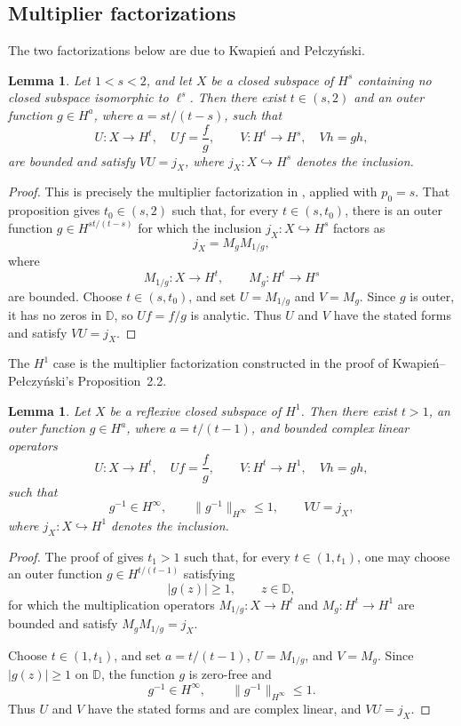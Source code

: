 \documentclass[11pt, reqno]{amsart}
\newtheorem{lemma}[theorem]{Lemma}
\theoremstyle{definition}
\theoremstyle{remark}
\newcommand{\D}{\mathbb{D}}
\begin{document}
\subsection{Multiplier factorizations}

The two factorizations below are due to
Kwapie\'n and Pe{\l}czy\'nski.

\begin{lemma}
\label{lem:kp-below2}
Let \(1<s<2\), and let \(X\) be a closed subspace of \(H^s\)
containing no closed subspace isomorphic to \(\ell^s\). Then there
exist \(t\in(s,2)\) and an outer function \(g\in H^a\), where \(a=st/(t-s)\), such that
\[
        U:X\to H^t,\quad Uf=\frac{f}{g},
        \qquad
        V:H^t\to H^s,\quad Vh=gh,
\]
are bounded and satisfy \(VU=j_X\), where
\(j_X:X\hookrightarrow H^s\) denotes the inclusion.
\end{lemma}

\begin{proof}
This is precisely the multiplier factorization in
\cite[Proposition~2.2a, p.~267]{KwapienPelczynski1976},
applied with \(p_0=s\). That proposition gives \(t_0\in(s,2)\)
such that, for every \(t\in(s,t_0)\), there is an outer function
\(g\in H^{st/(t-s)}
\)
for which the inclusion \(j_X:X\hookrightarrow H^s\) factors as
\[
        j_X=M_gM_{1/g},
\]
where
\[
        M_{1/g}:X\to H^t,
        \qquad
        M_g:H^t\to H^s
\]
are bounded. Choose \(t\in(s,t_0)\), and set
\(U=M_{1/g}\) and \(V=M_g\). Since \(g\) is outer, it has no zeros
in \(\D\), so \(Uf=f/g\) is analytic. Thus \(U\) and \(V\) have the
stated forms and satisfy \(VU=j_X\).
\end{proof}

The \(H^1\) case is the multiplier factorization constructed in the
proof of Kwapie\'n--Pe{\l}czy\'nski's Proposition~2.2.

\begin{lemma}
\label{lem:kp-H1}
Let \(X\) be a reflexive closed subspace of \(H^1\). Then there exist
\(t>1\), an outer function \(g\in H^a\), where
\(a=t/(t-1)\), and bounded complex linear operators
\[
        U:X\to H^t,\quad Uf=\frac{f}{g},
        \qquad
        V:H^t\to H^1,\quad Vh=gh,
\]
such that
\[
        g^{-1}\in H^\infty,
        \qquad
        \|g^{-1}\|_{H^\infty}\le1,
        \qquad
        VU=j_X,
\]
where \(j_X:X\hookrightarrow H^1\) denotes the inclusion.
\end{lemma}

\begin{proof}
The proof of
\cite[Proposition~2.2, pp.~265--266]{KwapienPelczynski1976}
gives \(t_1>1\) such that, for every \(t\in(1,t_1)\), one may choose
an outer function \(g\in H^{t/(t-1)}\) satisfying
\[
        |g(z)|\ge1,
        \qquad z\in\D,
\]
for which the multiplication operators
\(M_{1/g}:X\to H^t\) and \(M_g:H^t\to H^1\) are bounded and satisfy
\(M_gM_{1/g}=j_X\).

Choose \(t\in(1,t_1)\), and set
\(a=t/(t-1)\), \(U=M_{1/g}\), and \(V=M_g\).
Since \(|g(z)|\ge1\) on \(\D\), the function \(g\) is zero-free and
\[
        g^{-1}\in H^\infty,
        \qquad
        \|g^{-1}\|_{H^\infty}\le1.
\]
Thus \(U\) and \(V\) have the stated forms and are complex linear, and
\(VU=j_X\).
\end{proof}
\end{document}
